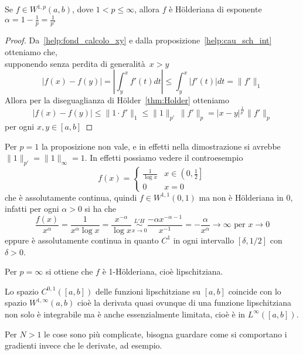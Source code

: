 \begin{proposition}
    Se \(f \in W^{1, p}{(a, b)}\), dove \(1 < p \le \infty\), allora \(f\) è
    Hölderiana di esponente \(\alpha = 1 - \frac{1}{p} = \frac{1}{p'}\)
\end{proposition}
\begin{proof}
    Da~\eqref{help:fond_calcolo_xy} e dalla proposizione~\ref{help:cau_sch_int}
    otteniamo che, \\ supponendo senza perdita di generalità~\(x > y\)
    \[
      |f{(x)} - f{(y)}| = \left| \int_{y}^{x} f'{(t)}dt \right| \le \int_y^{x}
      |f'{(t)}|dt = \|f'\|_1
    \]
    Allora per la diseguaglianza di Hölder~\ref{thm:Holder} otteniamo
    \[
      \left| f{(x)} - f{(y)} \right| \le \|1 \cdot  f'\|_1 \le 
      \|1\|_{p'}\,  \|f'\|_p= |x-y|^{\frac{1}{p'}} \|f'\|_p 
    \]
    per ogni \(x, y \in [a,b]\) 
\end{proof}
\begin{remark}
    Per \( p = 1\) la proposizione non vale, e in effetti nella dimostrazione si
    avrebbe \(\|1\|_{p'} = \|1\|_{\infty}= 1\). In effetti possiamo vedere il
    controesempio 
    \[
      f{(x)} = \begin{cases}
          \frac{1}{\log x} & x \in \left(0, \frac{1}{2}\right] \\
          0 & x = 0
      \end{cases}
    \]
    che è assolutamente continua, quindi \(f \in W^{1,1}{(0,1)}\) ma non è
    Hölderiana in 0, infatti per ogni \(\alpha > 0\) si ha che
    \[
        \frac{f{(x)}}{x^{\alpha}} = \frac{1}{x^{\alpha} \log x} =
        \frac{x^{-\alpha}}{\log x} \underset{x \to 0}{\overset{L'H}{\sim}} \frac{-\alpha x^{-\alpha -
        1}}{x^{-1}}= -\frac{\alpha}{x^{\alpha}}\to \infty \text{ per } x \to 0
    \]
    eppure è assolutamente continua in quanto \(C^{1}\) in ogni intervallo
    \([\delta, 1 /2]\) con \(\delta > 0\).
\end{remark}
\begin{note}
    Per \(p = \infty\) si ottiene che \(f\) è 1-Hölderiana, cioè lipschitziana.
\end{note}

Lo spazio \(C^{0, 1}{([a,b])}\) delle funzioni lipschitziane su \([a,b]\)
coincide con lo spazio \(W^{1, \infty}{(a,b)}\) cioè la derivata quasi ovunque
di una funzione lipschitziana non solo è integrabile ma è anche essenzialmente
limitata, cioè è in \(L^{\infty}{([a, b])}\).

Per \(N > 1\) le cose sono più complicate, bisogna guardare come si comportano i
gradienti invece che le derivate, ad esempio.

